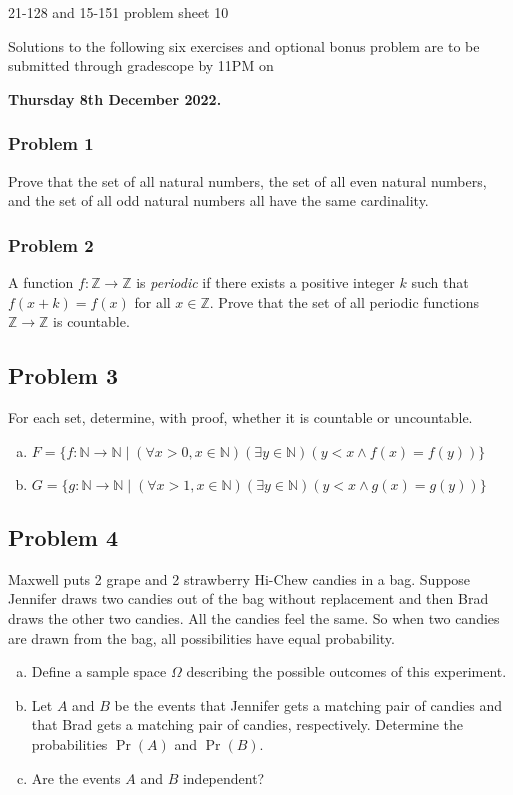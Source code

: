\newpage\documentclass[11pt,onecolumn,fleqn]{article}
\theoremstyle{definition}
\begin{document}
\thispagestyle{empty}
\begin{center}
{\Huge 21-128 and 15-151 problem sheet 10}

Solutions to the following six exercises and optional bonus problem are to be submitted through 
gradescope by 11PM on

\textbf{Thursday 8th December 2022.}

\end{center}

\subsubsection*{Problem 1}
Prove that the set of all natural numbers, the set of all even natural numbers, and the set of all odd natural 
numbers all have the same cardinality.

\subsubsection*{Problem 2}
A function $f : \mathbb{Z} \to \mathbb{Z}$ is \textit{periodic} if there exists a positive integer $k$ such that 
$f(x+k)=f(x)$ for all $x \in \mathbb{Z}$. Prove that the set of all periodic functions $\mathbb{Z} \to \mathbb{Z}$ is countable.

\subsection*{Problem 3}
For each set, determine, with proof, whether it is countable or uncountable.
\begin{enumerate}[(a)]
    \item $F = \{f: \mathbb{N} \rightarrow \mathbb{N} \mid (\forall x > 0, x \in \mathbb{N}) (\exists y \in \mathbb{N}) (y < x \wedge f(x) = f(y))\}$
    \item $G = \{g: \mathbb{N} \rightarrow \mathbb{N} \mid (\forall x > 1, x \in \mathbb{N}) (\exists y \in \mathbb{N}) (y < x \wedge g(x) = g(y))\}$
\end{enumerate}

\subsection*{Problem 4}
Maxwell puts 2 grape and 2 strawberry Hi-Chew candies in a bag. Suppose Jennifer draws two candies out of the bag without replacement and then Brad draws the other two candies.  All the candies feel the same.  So when two candies are drawn from the bag, all possibilities have equal probability.
\begin{enumerate}[(a)]
\item Define a sample space $\Omega$ describing the possible outcomes of this experiment.
\item Let $A$ and $B$ be the events that Jennifer gets a matching pair of candies and that Brad gets a matching pair of candies, respectively.  Determine the probabilities $\Pr(A)$ and $\Pr(B)$.
\item Are the events $A$ and $B$ independent?
\end{enumerate}
\newpage
\end{document}
